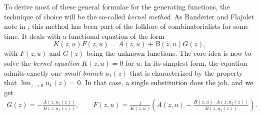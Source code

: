 To derive most of these general formulae for the generating functions, the technique of choice will be the so-called \textit{kernel method}. As Banderier and Flajolet note in \cite[p.~55]{Basic}, this method has been part of the folklore of combinatorialists for some time.
It deals with a functional equation of the form
$$
  K(z,u)F(z,u) = A(z,u) + B(z,u)G(z),
$$
with $F(z,u)$ and $G(z)$ being the unknown functions. The core idea is now to solve the \textit{kernel equation} $K(z,u) = 0$ for $u$. In its simplest form, the equation admits exactly one \textit{small branch} $u_1(z)$ that is characterized by the property that $\lim_{z \to 0} u_1(z) = 0$. In that case, a single substitution does the job, and we get
\begin{align*}
  G(z) = - \frac{A(z,u_1(z))}{B(z,u_1(z))}, \qquad
  F(z,u) = \frac{1}{K(z,u)}\left( A(z,u) - \frac{B(z,u) \cdot A(z,u_1(z))}{B(z,u_1(z))}\right).
\end{align*}

